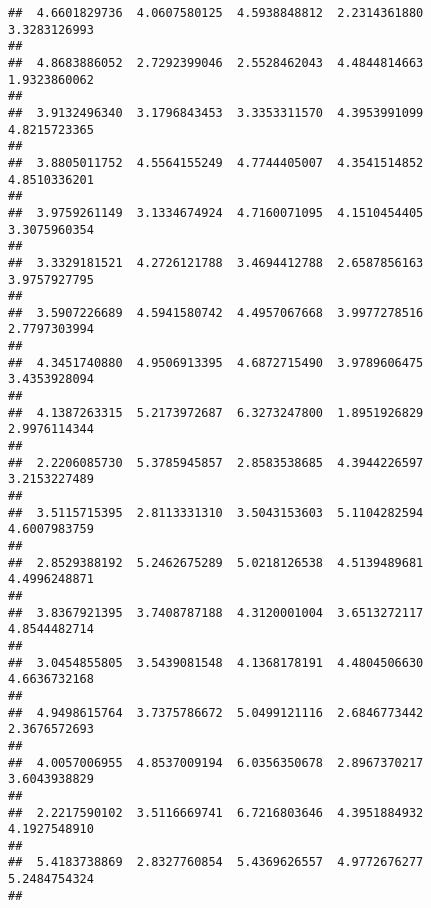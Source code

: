 \documentclass[]{article}
\begin{document}
\begin{verbatim}
##  4.6601829736  4.0607580125  4.5938848812  2.2314361880  3.3283126993 
##                                                                       
##  4.8683886052  2.7292399046  2.5528462043  4.4844814663  1.9323860062 
##                                                                       
##  3.9132496340  3.1796843453  3.3353311570  4.3953991099  4.8215723365 
##                                                                       
##  3.8805011752  4.5564155249  4.7744405007  4.3541514852  4.8510336201 
##                                                                       
##  3.9759261149  3.1334674924  4.7160071095  4.1510454405  3.3075960354 
##                                                                       
##  3.3329181521  4.2726121788  3.4694412788  2.6587856163  3.9757927795 
##                                                                       
##  3.5907226689  4.5941580742  4.4957067668  3.9977278516  2.7797303994 
##                                                                       
##  4.3451740880  4.9506913395  4.6872715490  3.9789606475  3.4353928094 
##                                                                       
##  4.1387263315  5.2173972687  6.3273247800  1.8951926829  2.9976114344 
##                                                                       
##  2.2206085730  5.3785945857  2.8583538685  4.3944226597  3.2153227489 
##                                                                       
##  3.5115715395  2.8113331310  3.5043153603  5.1104282594  4.6007983759 
##                                                                       
##  2.8529388192  5.2462675289  5.0218126538  4.5139489681  4.4996248871 
##                                                                       
##  3.8367921395  3.7408787188  4.3120001004  3.6513272117  4.8544482714 
##                                                                       
##  3.0454855805  3.5439081548  4.1368178191  4.4804506630  4.6636732168 
##                                                                       
##  4.9498615764  3.7375786672  5.0499121116  2.6846773442  2.3676572693 
##                                                                       
##  4.0057006955  4.8537009194  6.0356350678  2.8967370217  3.6043938829 
##                                                                       
##  2.2217590102  3.5116669741  6.7216803646  4.3951884932  4.1927548910 
##                                                                       
##  5.4183738869  2.8327760854  5.4369626557  4.9772676277  5.2484754324 
##                                                                       

\end{verbatim}
\end{document}
